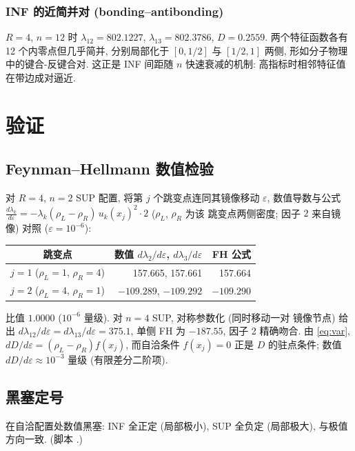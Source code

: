 \documentclass[UTF8]{ctexart}
\begin{document}
\subsubsection{INF 的近简并对 (bonding--antibonding)}

$R=4$, $n=12$ 时 $\lambda_{12} = 802.1227$, $\lambda_{13} = 802.3786$,
$D = 0.2559$. 两个特征函数各有 12 个内零点但几乎简并, 分别局部化于
$[0,1/2]$ 与 $[1/2,1]$ 两侧, 形如分子物理中的键合-反键合对. 这正是
INF 间距随 $n$ 快速衰减的机制: 高指标时相邻特征值在带边成对逼近.

\section{验证}\label{sec:verify}

\subsection{Feynman--Hellmann 数值检验}

对 $R=4$, $n=2$ SUP 配置, 将第 $j$ 个跳变点连同其镜像移动 $\varepsilon$,
数值导数与公式 $\frac{d\lambda_k}{d\varepsilon} =
-\lambda_k(\rho_L - \rho_R)\,u_k(x_j)^2\cdot 2$ ($\rho_L$, $\rho_R$ 为该
跳变点两侧密度; 因子 $2$ 来自镜像) 对照 ($\varepsilon = 10^{-6}$):
\begin{center}
\begin{tabular}{c|rr}
	跳变点 & 数值 $d\lambda_2/d\varepsilon$, $d\lambda_3/d\varepsilon$ & FH 公式 \\\hline
	$j = 1$ ($\rho_L = 1$, $\rho_R = 4$) & 157.665, 157.661 & 157.664\\
	$j = 2$ ($\rho_L = 4$, $\rho_R = 1$) & $-109.289$, $-109.292$ & $-109.290$\\
\end{tabular}
\end{center}
比值 $1.0000$ ($10^{-6}$ 量级). 对 $n=4$ SUP, 对称参数化 (同时移动一对
镜像节点) 给出 $d\lambda_{12}/d\varepsilon = d\lambda_{13}/d\varepsilon =
375.1$, 单侧 FH 为 $-187.55$, 因子 2 精确吻合. 由 \eqref{eq:var},
$dD/d\varepsilon = (\rho_L - \rho_R)f(x_j)$, 而自洽条件 $f(x_j) = 0$
正是 $D$ 的驻点条件; 数值 $dD/d\varepsilon \approx 10^{-3}$ 量级
(有限差分二阶项).

\subsection{黑塞定号}

在自洽配置处数值黑塞: INF 全正定 (局部极小), SUP 全负定 (局部极大),
与极值方向一致. (脚本 .)
\end{document}
